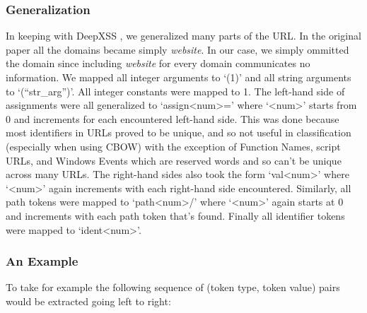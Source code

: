 \subsubsection{Generalization}
In keeping with DeepXSS \cite{fang2018deepxss}, we generalized many parts of the URL. In the original paper all the domains became simply \textit{website}. In our case, we simply ommitted the domain since including \textit{website} for every domain communicates no information. We mapped all integer arguments to `(1)' and all string arguments to `(``str\_arg'')'. All integer constants were mapped to 1. The left-hand side of assignments were all generalized to `assign<num>=' where `<num>' starts from 0 and increments for each encountered left-hand side. This was done because most identifiers in URLs proved to be unique, and so not useful in classification (especially when using CBOW) with the exception of Function Names, script URLs, and Windows Events which are reserved words and so can't be unique across many URLs. The right-hand sides also took the form `val<num>' where `<num>' again increments with each right-hand side encountered. Similarly, all path tokens were mapped to `path<num>/' where `<num>' again starts at 0 and increments with each path token that's found. Finally all identifier tokens were mapped to `ident<num>'.


\subsubsection{An Example}
To take for example  the following sequence of (token type, token value) pairs would be extracted going left to right:


